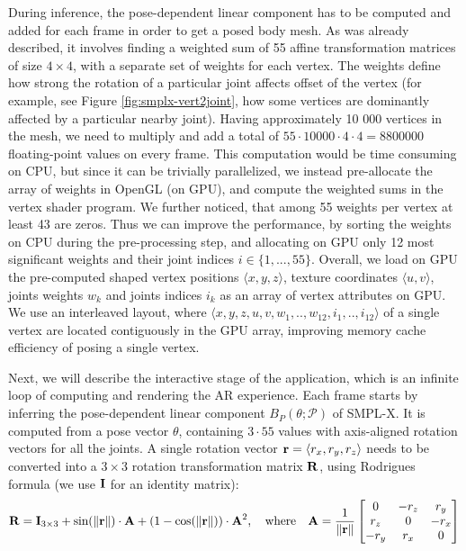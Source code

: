 During inference, the pose-dependent linear component has to be computed and added for each frame in order to get a posed body mesh. As was already described, it involves finding a weighted sum of 55 affine transformation matrices of size $4 \times 4$, with a separate set of weights for each vertex. The weights define how strong the rotation of a particular joint affects offset of the vertex (for example, see Figure \ref{fig:smplx-vert2joint}, how some vertices are dominantly affected by a particular nearby joint). Having approximately 10 000 vertices in the mesh, we need to multiply and add a total of $55 \cdot 10 000 \cdot 4 \cdot 4 = 8 800 000$ floating-point values on every frame. This computation would be time consuming on CPU, but since it can be trivially parallelized, we instead pre-allocate the array of weights in OpenGL (on GPU), and compute the weighted sums in the vertex shader program. We further noticed, that among 55 weights per vertex at least 43 are zeros. Thus we can improve the performance, by sorting the weights on CPU during the pre-processing step, and allocating on GPU only 12 most significant weights  and their joint indices $i \in \{1,...,55\}$. Overall, we load on GPU the pre-computed shaped vertex positions $\langle x, y, z \rangle$, texture coordinates $\langle u, v \rangle$, joints weights $w_k$ and joints indices $i_k$ as an array of vertex attributes on GPU. We use an interleaved layout, where $\langle x, y, z, u, v, w_1, .., w_{12}, i_1, .., i_{12}\rangle$ of a single vertex are located contiguously in the GPU array, improving memory cache efficiency of posing a single vertex. 

Next, we will describe the interactive stage of the application, which is an infinite loop of computing and rendering the AR experience. Each frame starts by inferring the pose-dependent linear component $B_P(\theta; \mathcal{P})$ of SMPL-X. It is computed from a pose vector $\theta$, containing $3 \cdot 55$ values with axis-aligned rotation vectors for all the joints. A single rotation vector $\bm{\mathrm{r}} = \langle r_x, r_y, r_z \rangle$ needs to be converted into a $3\times3$ rotation transformation matrix $\bm{\mathrm{R}}$, using Rodrigues \cite{aux:rodrigues11} formula (we use $\bm{\mathrm{I}}$ for an identity matrix):
\begin{equation}
	\bm{\mathrm{R}} = \bm{\mathrm{I}}_{3\times3} + \text{sin}(\|\bm{\mathrm{r}}\|)\cdot \bm{\mathrm{A}} + (1-\text{cos}(\|\bm{\mathrm{r}}\|))\cdot \bm{\mathrm{A}}^2,
	\quad \text{where} \quad
	\bm{\mathrm{A}} = \dfrac{1}{\|\bm{\mathrm{r}}\|}
	\begin{bmatrix} 
		0 & -r_z & r_y \\
		r_z & 0 & -r_x \\
		-r_y & r_x & 0
	\end{bmatrix}
	\label{methods:eq:rodrigues}
\end{equation}

